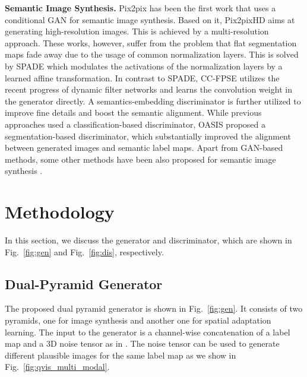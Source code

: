 \documentclass{bmvc2k}
\newcommand{\figref}[1]{Fig.~\ref{#1}}
\begin{document}
\textbf{Semantic Image Synthesis.} 
Pix2pix \cite{isola2017image} has been the first work that uses a conditional GAN \cite{mirza2014conditional} for semantic image synthesis.
Based on it, Pix2pixHD \cite{wang2018high} aims at generating high-resolution images. This is achieved by a multi-resolution approach.
These works, however, suffer from the problem that flat segmentation maps fade away due to the usage of common normalization layers.
This is solved by SPADE \cite{park2019semantic} which modulates the activations of the normalization layers by a learned affine transformation.
In contrast to SPADE, CC-FPSE \cite{liu2019learning} utilizes the recent progress of dynamic filter networks and learns the convolution weight in the generator directly. A semantics-embedding discriminator is further utilized to improve fine details and boost the semantic alignment.
While previous approaches used a classification-based discriminator, OASIS \cite{schonfeld_sushko_iclr2021} proposed a segmentation-based discriminator, which substantially improved the alignment between generated images and semantic label maps.
Apart from GAN-based methods, some other methods have been also proposed for semantic image synthesis \cite{chen2017photographic,qi2018semi,wang2018high,huang2018multimodal,jiang2020tsit,lee2018diverse}.




\begin{figure*}[t]
    \centering
    \caption{The proposed discriminator exploits supervision at different scales including a loss at patch level (left), feature level (top right), and pixel level (bottom right). }
    \label{fig:dis}
    \vspace{-5mm}
\end{figure*}

\section{Methodology}



In this section, we discuss the generator and discriminator, which are shown in \figref{fig:gen} and \figref{fig:dis}, respectively. 

\subsection{Dual-Pyramid Generator}
The proposed dual pyramid generator is shown in \figref{fig:gen}. It consists of two pyramids, one for image synthesis and another one for spatial adaptation learning. The input to the generator is a channel-wise concatenation of a label map  and a 3D noise tensor  as in \cite{schonfeld_sushko_iclr2021}. The noise tensor can be used to generate different plausible images for the same label map as we show in Fig.~\ref{fig:qvis_multi_modal}. 
\end{document}
